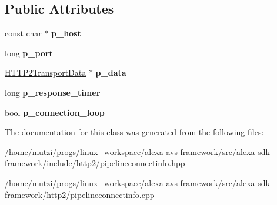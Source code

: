 \subsection*{Public Attributes}
\begin{DoxyCompactItemize}
\item 
\mbox{\label{classhttp2_1_1PipelineConnectInfo_ad5e45a5b49469a37465adc1fd2720cf7}} 
const char $\ast$ {\bfseries p\+\_\+host}
\item 
\mbox{\label{classhttp2_1_1PipelineConnectInfo_a319e17905986c409f502be92021b7920}} 
long {\bfseries p\+\_\+port}
\item 
\mbox{\label{classhttp2_1_1PipelineConnectInfo_a7dd1ec0ecc4aa450d5d190e4f1030620}} 
\hyperlink{classhttp2_1_1HTTP2TransportData}{H\+T\+T\+P2\+Transport\+Data} $\ast$ {\bfseries p\+\_\+data}
\item 
\mbox{\label{classhttp2_1_1PipelineConnectInfo_a1ca8b63205107cbd0f5633527e921f4c}} 
long {\bfseries p\+\_\+response\+\_\+timer}
\item 
\mbox{\label{classhttp2_1_1PipelineConnectInfo_a6d279548e7fb09b92a3f5cac1e2c9492}} 
bool {\bfseries p\+\_\+connection\+\_\+loop}
\end{DoxyCompactItemize}


The documentation for this class was generated from the following files\+:\begin{DoxyCompactItemize}
\item 
/home/mutzi/progs/linux\+\_\+workspace/alexa-\/avs-\/framework/src/alexa-\/sdk-\/framework/include/http2/pipelineconnectinfo.\+hpp\item 
/home/mutzi/progs/linux\+\_\+workspace/alexa-\/avs-\/framework/src/alexa-\/sdk-\/framework/http2/pipelineconnectinfo.\+cpp\end{DoxyCompactItemize}
